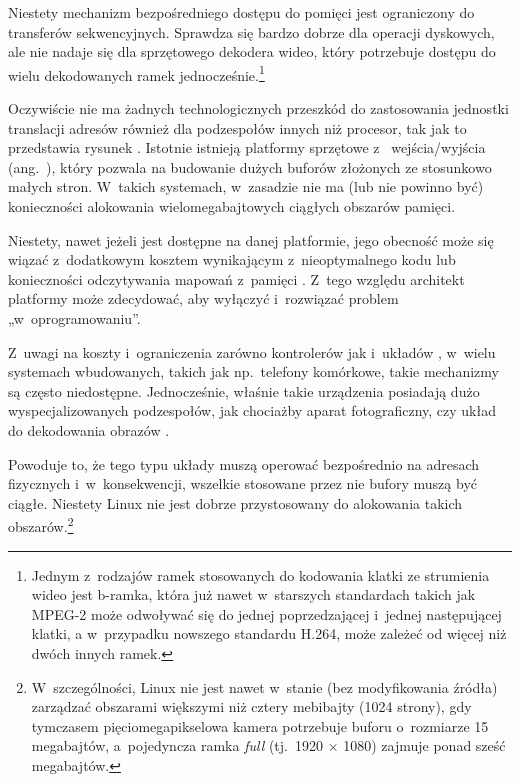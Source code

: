 Niestety mechanizm bezpośredniego dostępu do pomięci jest ograniczony
do transferów sekwencyjnych.  Sprawdza się bardzo dobrze dla operacji
dyskowych, ale nie nadaje się dla sprzętowego dekodera wideo, który
potrzebuje dostępu do wielu dekodowanych ramek
jednocześnie.\footnote{Jednym z~rodzajów ramek stosowanych do
  kodowania klatki ze strumienia wideo jest b-ramka, która już nawet
  w~starszych standardach takich jak MPEG-2 może odwoływać się do
  jednej poprzedzającej i~jednej następującej klatki, a w~przypadku
  nowszego standardu H.264, może zależeć od więcej niż dwóch innych
  ramek.}

Oczywiście nie ma żadnych technologicznych przeszkód do zastosowania
jednostki translacji adresów również dla podzespołów innych niż
procesor, tak jak to przedstawia rysunek .
Istotnie istnieją platformy sprzętowe z~ wejścia/wyjścia
(ang.\ ), który pozwala na budowanie dużych buforów złożonych ze
stosunkowo małych stron.  W~takich systemach, w~zasadzie nie ma (lub
nie powinno być) konieczności alokowania wielomegabajtowych ciągłych
obszarów pamięci.

Niestety, nawet jeżeli  jest dostępne na danej platformie, jego
obecność może się wiązać z~dodatkowym kosztem wynikającym
z~nieoptymalnego kodu \autocite{bib:price-of-safety} lub konieczności
odczytywania mapowań z~pamięci
\autocite{bib:mitigate-iotlb-bottleneck}.  Z~tego względu architekt
platformy może zdecydować, aby wyłączyć  i~rozwiązać problem
„w~oprogramowaniu”.

Z~uwagi na koszty i~ograniczenia zarówno kontrolerów  jak
i~układów , w~wielu systemach wbudowanych, takich jak
np.\ telefony komórkowe, takie mechanizmy są często niedostępne.
Jednocześnie, właśnie takie urządzenia posiadają dużo
wyspecjalizowanych podzespołów, jak chociażby aparat fotograficzny,
czy układ do dekodowania obrazów .

Powoduje to, że tego typu układy muszą operować bezpośrednio na
adresach fizycznych i~w~konsekwencji, wszelkie stosowane przez nie
bufory muszą być ciągłe.  Niestety Linux nie jest dobrze przystosowany
do alokowania takich obszarów.\footnote{W~szczególności, Linux nie
  jest nawet w~stanie (bez modyfikowania źródła) zarządzać obszarami
  większymi niż cztery mebibajty (1024 strony), gdy tymczasem
  pięciomegapikselowa kamera potrzebuje buforu o~rozmiarze 15
  megabajtów, a~pojedyncza ramka \textit{full } (tj.\ 1920 $\times$
  1080) zajmuje ponad sześć megabajtów.}


